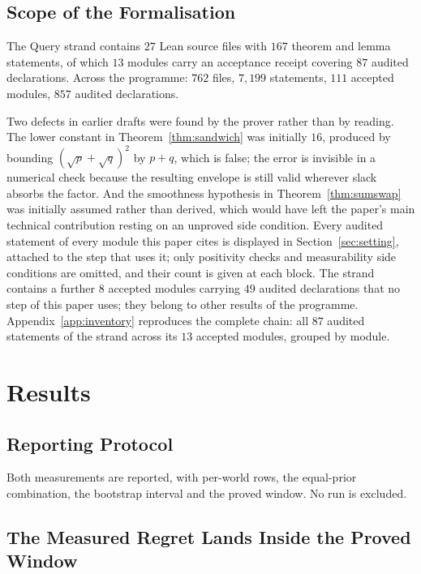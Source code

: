 \subsection{Scope of the Formalisation}

The Query strand contains $27$ Lean source files with $167$ theorem and lemma statements,
of which $13$ modules carry an acceptance receipt covering $87$ audited declarations. Across
the programme: $762$ files, $7{,}199$ statements, $111$ accepted modules, $857$ audited
declarations.

Two defects in earlier drafts were found by the prover rather than by reading. The lower
constant in Theorem~\ref{thm:sandwich} was initially $16$, produced by bounding
$(\sqrt{p}+\sqrt{q})^{2}$ by $p+q$, which is false; the error is invisible in a numerical
check because the resulting envelope is still valid wherever slack absorbs the factor. And the
smoothness hypothesis in Theorem~\ref{thm:sumswap} was initially assumed rather than derived,
which would have left the paper's main technical contribution resting on an unproved side
condition. Every audited statement of every module this paper cites is displayed in Section~\ref{sec:setting}, attached to the step that uses it; only positivity checks and measurability side conditions are omitted, and their count is given at each block. The strand contains a further $8$ accepted modules carrying $49$ audited declarations that no step of this paper uses; they belong to other results of the programme. Appendix~\ref{app:inventory} reproduces the complete chain: all $87$ audited statements of the strand across its $13$ accepted modules, grouped by module.

\section{Results}
\label{sec:results}

\subsection{Reporting Protocol}

Both measurements are reported, with per-world rows, the equal-prior combination, the
bootstrap interval and the proved window. No run is excluded.

\subsection{The Measured Regret Lands Inside the Proved Window}


